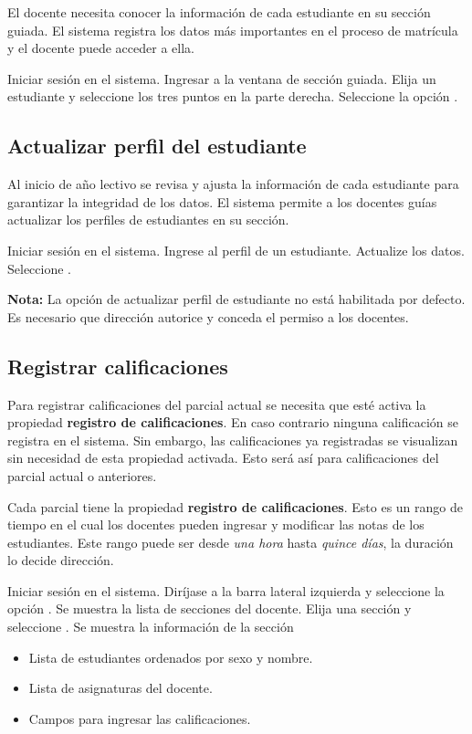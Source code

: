 \documentclass[12pt]{article}
\begin{document}
    El docente necesita conocer la información de cada estudiante en su sección guiada.
    El sistema \wsm registra los datos más importantes en el proceso de matrícula y el docente puede acceder a ella.

    \stepTitle

     Iniciar sesión en el sistema.
     Ingresar a la ventana de sección guiada.
     Elija un estudiante y seleccione los tres puntos en la parte derecha.
     Seleccione la opción .


    \subsection{Actualizar perfil del estudiante}

    Al inicio de año lectivo se revisa y ajusta la información de cada estudiante para garantizar la integridad de los datos.
    El sistema \wsm permite a los docentes guías actualizar los perfiles de estudiantes en su sección.

    \stepTitle
     Iniciar sesión en el sistema.
     Ingrese al perfil de un estudiante.
     Actualize los datos.
     Seleccione .

    \textbf{Nota:} La opción de actualizar perfil de estudiante no está habilitada por defecto.
    Es necesario que dirección autorice y conceda el permiso a los docentes.


    \subsection{Registrar calificaciones}

    Para registrar calificaciones del parcial actual se necesita que esté activa la propiedad \textbf{registro de calificaciones}.
    En caso contrario ninguna calificación se registra en el sistema.
    Sin embargo, las calificaciones ya registradas se visualizan sin necesidad de esta propiedad activada.
    Esto será así para calificaciones del parcial actual o anteriores.

    Cada parcial tiene la propiedad \textbf{registro de calificaciones}.
    Esto es un rango de tiempo en el cual los docentes pueden ingresar y modificar las notas de los estudiantes.
    Este rango puede ser desde \textit{una hora} hasta \textit{quince días}, la duración lo decide dirección.


    \stepTitle
     Iniciar sesión en el sistema.
     Diríjase a la barra lateral izquierda y seleccione la opción .
     Se muestra la lista de secciones del docente.
     Elija una sección y seleccione .
     Se muestra la información de la sección
    \begin{itemize}
        \item Lista de estudiantes ordenados por sexo y nombre.
        \item Lista de asignaturas del docente.
        \item Campos para ingresar las calificaciones.
    \end{itemize}
\end{document}
